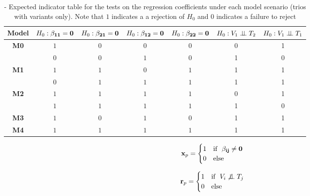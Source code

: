 \documentclass[12pt]{report}
\begin{document}
\begin{table}[H]
\centering
\caption{- Expected indicator table for the tests on the regression coefficients under each model scenario (trios with variants only). Note that $1$ indicates a a rejection of $H_0$ and $0$ indicates a failure to reject}
\begin{tabular}{|c||c|c|c|c||c|c|}
\hline
\bf Model  & $H_0: \bf\beta_{11} = 0$  &  $H_0:\bf\beta_{21}=0$   & $H_0:\bf\beta_{12}=0$    & $H_0:\bf\beta_{22}=0$    & $ H_0: V_1 \perp \!\!\! \perp T_2$    & $H_0: V_1 \perp \!\!\! \perp T_1$    \\ \hline \hline
\bf M0      &  $1$            & $ 0$                  & $0$                & $0$                    & 0                      &1           \\ \hline 
               &  $0$            & $ 0$                  & $1$                & $0$                    &1                         &0           \\ \hline
\bf M1      &  $1$            & $1$                  & $0$                & $1$                   & 1                        &1            \\ \hline
               &  $0$            & $1$                 & $1$                & $1$                    & 1                          &1       \\ \hline
\bf M2      &  $1$            & $1$                 & $1$                & $1$                   & 0                         & 1          \\ \hline
               &  $1$            & $1$                 & $1$                & $1$                   &  1                          & 0          \\ \hline
\bf M3      &  $1$            & $0$                 & $1$               & $0$                   &1                          &  1          \\ \hline
\bf M4      &  $1$            & $1$                 & $1$               & $1$                  & 1                         &  1           \\ \hline \hline

\end{tabular}
\end{table}

\[ {\bf x}_p = \begin{cases} 1 & \text{if} \ \ {\bf\beta_{ij} \neq 0} \\ 0 & \text{else} \end{cases} \]

\[  {\bf r}_p = \begin{cases} 1 & \text{if} \ \ V_i \not\perp \!\!\! \perp T_j \\ 0 & \text{else} \end{cases} \]
\end{document}
